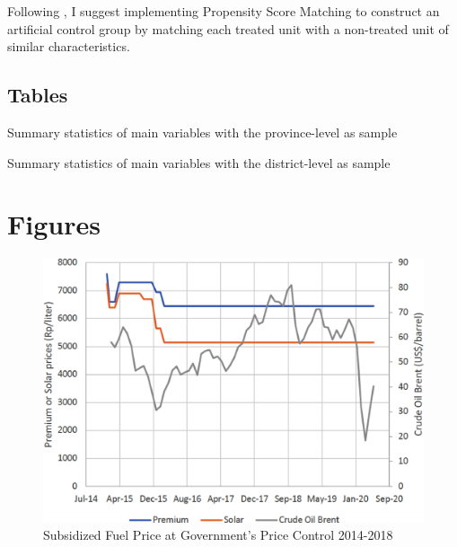\documentclass[letterpaper,12pt,leqno]{article}
\newcommand{\bib}{bibliography.bib}
\begin{document}
Following \citet{abadie2016}, I suggest implementing Propensity Score Matching to construct an artificial control group by matching each treated unit with a non-treated unit of similar characteristics.



\newpage
\appendix
\begin{landscape}
\section{Tables}\label{a:table}

\begin{table}[h]
\caption{Summary statistics of main variables with the province-level as sample} 
\scalebox{0.79}{}
\label{t:1}\end{table}


\begin{table}[h]
\caption{Summary statistics of main variables with the district-level as sample} 
\scalebox{0.79}{}
\label{t:2}\end{table}




\end{landscape}

\section{Figures}

\begin{figure}[h]
\includegraphics[scale=0.7]{Final_Project/image/bbm-price-2014-2018.jpg}
\caption{Subsidized Fuel Price at Government's Price Control 2014-2018}
\label{f:graph1}
\end{figure}
\end{document}
